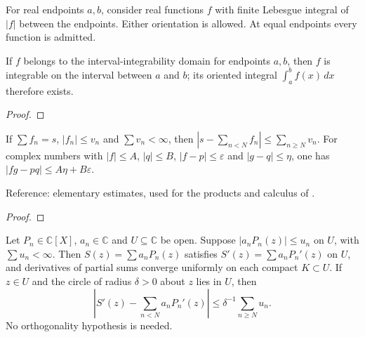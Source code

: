 \begin{supporting}

\begin{definition}
\label{def:interval-integrable-input}
\leanok
For real endpoints $a,b$, consider real functions $f$
with finite Lebesgue integral of $|f|$ between the endpoints. Either orientation
is allowed. At equal endpoints every function is admitted.
\end{definition}

\begin{theorem}
\label{thm:interval-integrable-input}
\leanok
If $f$ belongs to the interval-integrability domain for endpoints $a,b$,
then $f$ is integrable on the interval between $a$ and $b$; its oriented
integral $\int_a^b f(x)\,dx$ therefore exists.
\end{theorem}
\begin{proof}
\leanok
\end{proof}

\begin{theorem}
\label{thm:series-operation-errors}
\leanok
If $\sum f_n=s$, $|f_n|\le v_n$ and $\sum v_n<\infty$, then
$|s-\sum_{n<N}f_n|\le\sum_{n\ge N}v_n$.
For complex numbers with $|f|\le A$, $|q|\le B$, $|f-p|\le\varepsilon$ and
$|g-q|\le\eta$, one has $|fg-pq|\le A\eta+B\varepsilon$.

Reference: elementary estimates, used for the products and calculus of \cite[Chapters 3 and 21]{atap}.
\end{theorem}
\begin{proof}
\leanok
\end{proof}

\begin{theorem}
\label{thm:normal-series-differentiation}
\leanok
Let $P_n\in\mathbb C[X]$, $a_n\in\mathbb C$ and $U\subseteq\mathbb C$ be open.
Suppose $|a_nP_n(z)|\le u_n$ on $U$, with $\sum u_n<\infty$.
Then $S(z)=\sum a_nP_n(z)$ satisfies $S'(z)=\sum a_nP_n'(z)$ on $U$,
and derivatives of partial sums converge uniformly on each compact $K\subset U$.
If $z\in U$ and the circle of radius $\delta>0$ about $z$ lies in $U$, then
\[
 \left|S'(z)-\sum_{n<N}a_nP_n'(z)\right|
 \le \delta^{-1}\sum_{n\ge N}u_n.
\]
No orthogonality hypothesis is needed.


\end{theorem}
\end{supporting}
